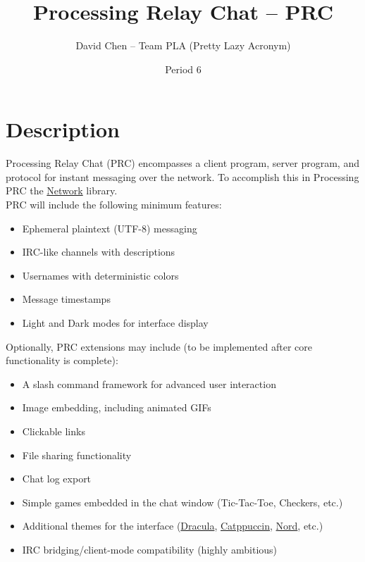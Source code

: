 \documentclass{article}
\title{Processing Relay Chat -- PRC}
\author{David Chen -- Team PLA (Pretty Lazy Acronym)}
\date{Period 6}
\begin{document}
\maketitle

\section{Description}
Processing Relay Chat (PRC) encompasses a client program, server program, and protocol for instant messaging over the network. To accomplish this in Processing PRC the \href{https://processing.org/reference/libraries/net/index.html}{Network} library.\\
PRC will include the following minimum features:
\begin{itemize}
    \item Ephemeral plaintext (UTF-8) messaging
    \item IRC-like channels with descriptions
    \item Usernames with deterministic colors
    \item Message timestamps
    \item Light and Dark modes for interface display
\end{itemize}

Optionally, PRC extensions may include (to be implemented after core functionality is complete):
\begin{itemize}
    \item A slash command framework for advanced user interaction
    \item Image embedding, including animated GIFs
    \item Clickable links
    \item File sharing functionality
    \item Chat log export
    \item Simple games embedded in the chat window (Tic-Tac-Toe, Checkers, etc.)
    \item Additional themes for the interface (\href{https://draculatheme.com/}{Dracula}, \href{https://catppuccin.com/}{Catppuccin}, \href{https://www.nordtheme.com/}{Nord}, etc.)
    \item IRC bridging/client-mode compatibility (highly ambitious)
\end{itemize}
\end{document}
